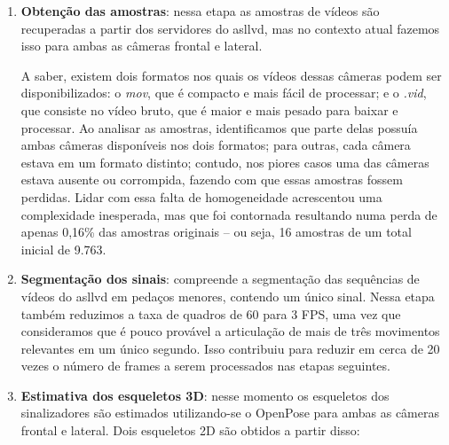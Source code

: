 
\begin{enumerate}
    \item \textbf{Obtenção das amostras}: nessa etapa as amostras de vídeos são recuperadas a partir dos servidores do \acrshort{asllvd}, mas no contexto atual fazemos isso para ambas as câmeras frontal e lateral.

          A saber, existem dois formatos nos quais os vídeos dessas câmeras podem ser disponibilizados: o \textit{mov}, que é compacto e mais fácil de processar; e o \textit{.vid}, que consiste no vídeo bruto, que é maior e mais pesado para baixar e processar.
          Ao analisar as amostras, identificamos que parte delas possuía ambas câmeras disponíveis nos dois formatos; para outras, cada câmera estava em um formato distinto; contudo, nos piores casos uma das câmeras estava ausente ou corrompida, fazendo com que essas amostras fossem perdidas. Lidar com essa falta de homogeneidade acrescentou uma complexidade inesperada, mas que foi contornada resultando numa perda de apenas 0,16\% das amostras originais -- ou seja, 16 amostras de um total inicial de 9.763.


    \item \textbf{Segmentação dos sinais}: compreende a segmentação das sequências de vídeos do \acrshort{asllvd} em pedaços menores, contendo um único sinal.
          Nessa etapa também reduzimos a taxa de quadros de 60 para 3 FPS, uma vez que consideramos que é pouco provável a articulação de mais de três movimentos relevantes em um único segundo.
          Isso contribuiu para reduzir em cerca de 20 vezes o número de frames a serem processados nas etapas seguintes.


    \item \textbf{Estimativa dos esqueletos 3D}: nesse momento os esqueletos dos sinalizadores são estimados utilizando-se o OpenPose para ambas as câmeras frontal e lateral. Dois esqueletos 2D são obtidos a partir disso:


\end{enumerate}
